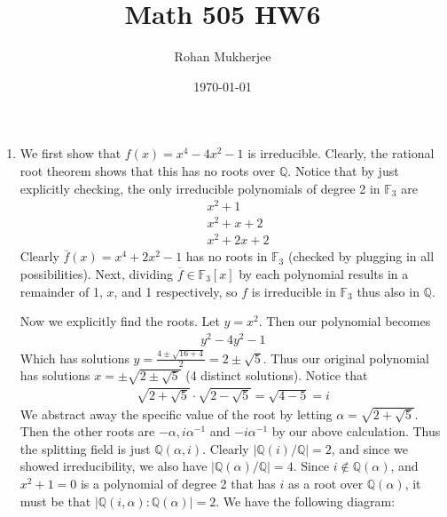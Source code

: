 \documentclass[12pt]{article}
\title{Math 505 HW6}
\date{\today}
\author{Rohan Mukherjee}
\theoremstyle{definitionstyle}
\def\mbb#1{\mathbb{#1}}
\newcommand{\F}{\mbb F}
\newcommand{\Q}{\mbb Q}
\begin{document}
	\maketitle
	\begin{enumerate}[leftmargin=\labelsep]
		\item We first show that $f(x) = x^4 - 4x^2 - 1$ is irreducible. Clearly, the rational root theorem shows that this has no roots over $\Q$. Notice that by just explicitly checking, the only irreducible polynomials of degree 2 in $\F_3$ are
		\begin{align*}
			&x^2+1 \\
			&x^2+x+2 \\
			&x^2+2x+2
		\end{align*}
		Clearly $\overline f(x) = x^4 + 2x^2 - 1$ has no roots in $\F_3$ (checked by plugging in all possibilities). Next, dividing $\overline f \in \F_3[x]$ by each polynomial results in a remainder of 1, $x$, and 1 respectively, so $f$ is irreducible in $\F_3$ thus also in $\Q$.
		
		Now we explicitly find the roots. Let $y = x^2$. Then our polynomial becomes 
		\begin{align*}
			y^2 - 4y^2 - 1
		\end{align*}
		Which has solutions $y = \frac{4 \pm \sqrt{16+4}}{2} = 2 \pm \sqrt{5}$. Thus our original polynomial has solutions $x = \pm \sqrt{2 \pm \sqrt{5}}$ (4 distinct solutions). Notice that
		\begin{align*}
			\sqrt{2+\sqrt{5}} \cdot \sqrt{2-\sqrt{5}} = \sqrt{4-5} = i
		\end{align*}
		We abstract away the specific value of the root by letting $\alpha = \sqrt{2+\sqrt{5}}$. Then the other roots are $-\alpha, i\alpha^{-1}$ and $-i\alpha^{-1}$ by our above calculation. Thus the splitting field is just $\Q(\alpha, i)$. Clearly $|\Q(i)/\Q|=2$, and since we showed irreducibility, we also have $|\Q(\alpha)/\Q| = 4$. Since $i \not \in \Q(\alpha)$, and $x^2+1=0$ is a polynomial of degree 2 that has $i$ as a root over $\Q(\alpha)$, it must be that $|\Q(i, \alpha) : \Q(\alpha)| = 2$. We have the following diagram:
		

\end{enumerate}
\end{document}
